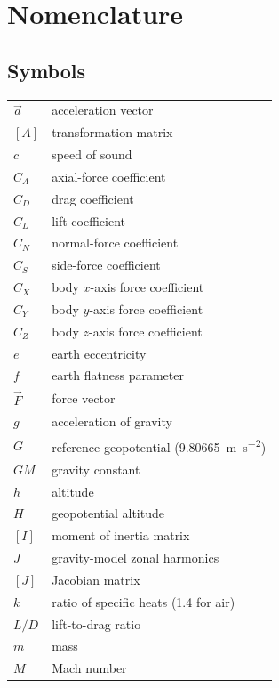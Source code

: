 \chapter*{Nomenclature}

\section*{Symbols}
\begingroup
\setlength{\LTpre}{0pt}
\setlength{\LTpost}{0pt}
\renewcommand{\arraystretch}{1.08}
\begin{longtable}{@{}>{\raggedleft\arraybackslash}p{}p{}@{}}
$\vec{a}$ & acceleration vector \\
$[A]$ & transformation matrix \\
$c$ & speed of sound \\
$C_A$ & axial-force coefficient \\
$C_D$ & drag coefficient \\
$C_L$ & lift coefficient \\
$C_N$ & normal-force coefficient \\
$C_S$ & side-force coefficient \\
$C_X$ & body $x$-axis force coefficient \\
$C_Y$ & body $y$-axis force coefficient \\
$C_Z$ & body $z$-axis force coefficient \\
$e$ & earth eccentricity \\
$f$ & earth flatness parameter \\
$\vec{F}$ & force vector \\
$g$ & acceleration of gravity \\
$G$ & reference geopotential (\SI{9.80665}{\metre\per\second\squared}) \\
$GM$ & gravity constant \\
$h$ & altitude \\
$H$ & geopotential altitude \\
$[I]$ & moment of inertia matrix \\
$J$ & gravity-model zonal harmonics \\
$[J]$ & Jacobian matrix \\
$k$ & ratio of specific heats (1.4 for air) \\
$L/D$ & lift-to-drag ratio \\
$m$ & mass \\
$M$ & Mach number \\

\end{longtable}
